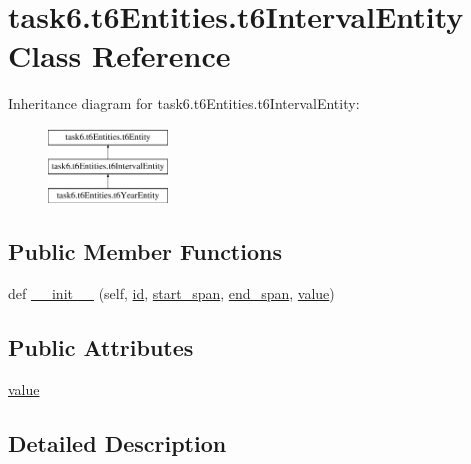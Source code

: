 \hypertarget{classtask6_1_1t6Entities_1_1t6IntervalEntity}{}\section{task6.\+t6\+Entities.\+t6\+Interval\+Entity Class Reference}
\label{classtask6_1_1t6Entities_1_1t6IntervalEntity}
Inheritance diagram for task6.\+t6\+Entities.\+t6\+Interval\+Entity\+:\begin{figure}[H]
\begin{center}
\leavevmode
\includegraphics[height=2.000000cm]{classtask6_1_1t6Entities_1_1t6IntervalEntity}
\end{center}
\end{figure}
\subsection*{Public Member Functions}
\begin{DoxyCompactItemize}
\item 
def \hyperlink{classtask6_1_1t6Entities_1_1t6IntervalEntity_a1ac32d786c2759c6886bcde28846eb0d}{\+\_\+\+\_\+init\+\_\+\+\_\+} (self, \hyperlink{classtask6_1_1t6Entities_1_1t6Entity_a96b2e7fb553c920ab2db6f6deb31e3b4}{id}, \hyperlink{classtask6_1_1t6Entities_1_1t6Entity_a8221c36d2995a24200cdfbd74cc9233c}{start\+\_\+span}, \hyperlink{classtask6_1_1t6Entities_1_1t6Entity_a597d42bb02fc9f42277098f0ce21917c}{end\+\_\+span}, \hyperlink{classtask6_1_1t6Entities_1_1t6IntervalEntity_a002714e201e05948aca8cce83d4a9da6}{value})
\end{DoxyCompactItemize}
\subsection*{Public Attributes}
\begin{DoxyCompactItemize}
\item 
\hyperlink{classtask6_1_1t6Entities_1_1t6IntervalEntity_a002714e201e05948aca8cce83d4a9da6}{value}
\end{DoxyCompactItemize}


\subsection{Detailed Description}


